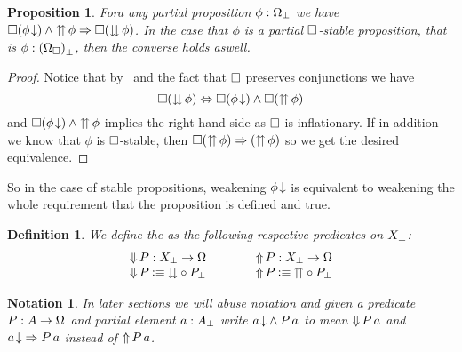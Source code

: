 \documentclass[11pt]{article}
\newtheorem{prop}[thrm]{Proposition}
\newtheorem{defn}[thrm]{Definition}
\newtheorem{nota}[thrm]{Notation}
\begin{document}
\begin{prop}\label{prop:boxed-squash-and-boxed-squish}
  Fora any partial proposition \(\phi : {\Omega}_\bot\) we have
  \({{\Box{({{\phi}\!\downarrow})}}\land{{\upuparrows}\,{\phi}}}\Rightarrow{\Box{({\downdownarrows}\,{\phi})}}\).
  In the case that \(\phi\) is a partial \(\Box\)-stable proposition, that
  is \(\phi : {(\Omega_\Box)}_\bot\), then the converse holds aswell.
\end{prop}
\begin{proof}
  Notice that by~ and the fact that \(\Box\)
  preserves conjunctions we have
  \[
    \IIFF%
    {\IBox{(\ISquash{\phi})}}%
    {\IAnd{\IBox{(\ITotal{\phi})}}{\IBox{(\ISquish{\phi})}}}
  \]
  and \({\Box{({{\phi}\!\downarrow})}}\land{{\upuparrows}\,{\phi}}\) implies the right hand
  side as \(\Box\) is inflationary.
  If in addition we know that \(\phi\) is \(\Box\)-stable,
  then \({\Box{({\upuparrows}\,{\phi})}}\Rightarrow{({\upuparrows}\,{\phi})}\) so
  we get the desired equivalence.
\end{proof}

So in the case of stable propositions, weakening \({{\phi}\!\downarrow}\) is equivalent
to weakening the whole requirement that the proposition is defined and true.

\begin{defn}
  We define the  as the following respective predicates on
  \({X}_\bot\):
  \[\arraycolsep=2em
    \begin{array}{ll}
      \IParEExt{P} : \IPar{X} \to \IProp
      &
        \IParUExt{P} : \IPar{X} \to \IProp
      \\
      \IParEExt{P} \IsDefined \ISquashSym\circ\IPar{P}
      &
        \IParUExt{P} \IsDefined \ISquishSym\circ\IPar{P}
    \end{array}
  \]
\end{defn}

\begin{nota}
  In later sections we will abuse notation and given a predicate
  \(P : A \to \Omega\) and partial element \(a : {A}_\bot\) write
  \({{{a}\!\downarrow}}\land{P\,a}\) to mean \({\Downarrow}\,{P}\,a\) and
  \({{{a}\!\downarrow}}\Rightarrow{P\,a}\) instead of \({\Uparrow}\,{P}\,a\).
\end{nota}
\end{document}
